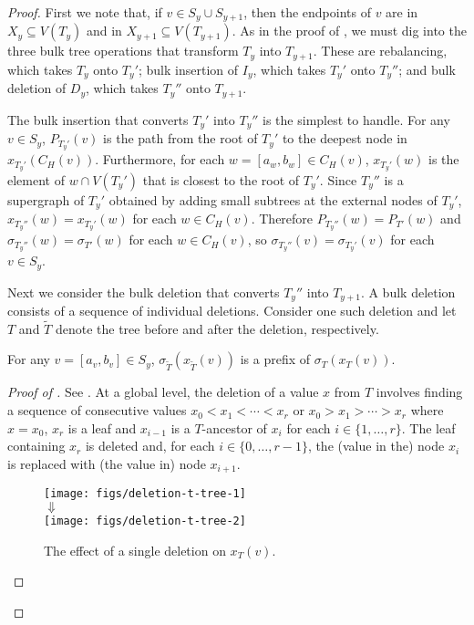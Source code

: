 \documentclass[kpfonts]{patmorin}
\begin{document}
\begin{proof}
  First we note that, if $v\in S_y\cup S_{y+1}$, then the endpoints of $v$ are in $X_y\subseteq V(T_y)$ and in $X_{y+1}\subseteq V(T_{y+1})$.
  As in the proof of , we must dig into the three bulk tree operations that transform $T_y$ into $T_{y+1}$. These are rebalancing, which takes $T_y$ onto $T_y'$; bulk insertion of $I_y$, which takes $T_y'$ onto $T_y''$; and bulk deletion of $D_y$, which takes $T_y''$ onto $T_{y+1}$.
  
  The bulk insertion that converts $T_y'$ into $T_y''$ is the simplest to handle.  For any $v\in S_y$, $P_{T_y'}(v)$ is the path from the root of $T_y'$ to the deepest node in $x_{T_y'}(C_H(v))$.  Furthermore, for each $w=[a_w,b_w]\in C_H(v)$, $x_{T_y'}(w)$ is the element of $w\cap V(T_y')$ that is closest to the root of $T_y'$. Since $T_y''$ is a supergraph of $T_y'$ obtained by adding small subtrees at the external nodes of $T_y'$, $x_{T_y''}(w)=x_{T_y'}(w)$ for each $w\in C_H(v)$.  Therefore $P_{T_y''}(w)=P_{T'}(w)$ and $\sigma_{T_y''}(w)=\sigma_{T'}(w)$ for each $w\in C_H(v)$, so $\sigma_{T_y''}(v)=\sigma_{T_y'}(v)$ for each $v\in S_y$.
  
  Next we consider the bulk deletion that converts $T_y''$ into $T_{y+1}$.  A bulk deletion consists of a sequence of individual deletions. Consider one such deletion and let $T$ and $\tilde{T}$ denote the tree before and after the deletion, respectively.  
  
  \begin{clm}
    For any $v=[a_v,b_v]\in S_y$, $\sigma_{\tilde{T}}(x_{\tilde{T}}(v))$ is a prefix of $\sigma_T(x_T(v))$.   
  \end{clm}
  
  \begin{proof}[Proof of ]  
    See .  At a global level, the deletion of a value $x$ from $T$ involves finding a sequence of consecutive values $x_0<x_1<\cdots<x_r$ or $x_0>x_1>\cdots>x_r$ where $x=x_0$, $x_r$ is a leaf and $x_{i-1}$ is a $T$-ancestor of $x_{i}$ for each $i\in\{1,\ldots,r\}$.  The leaf containing $x_r$ is deleted and, for each $i\in\{0,\ldots,r-1\}$, the (value in the) node $x_i$ is replaced with (the value in) node $x_{i+1}$.  

    \begin{figure}
      \begin{center}
        \texttt{[image: figs/deletion-t-tree-1]}\\[1ex]
        $\Downarrow$\\[1ex]   
        \texttt{[image: figs/deletion-t-tree-2]}   
      \end{center}
      \caption{The effect of a single deletion on $x_T(v)$.}
    \end{figure}
    

\end{proof}
\end{proof}
\end{document}
